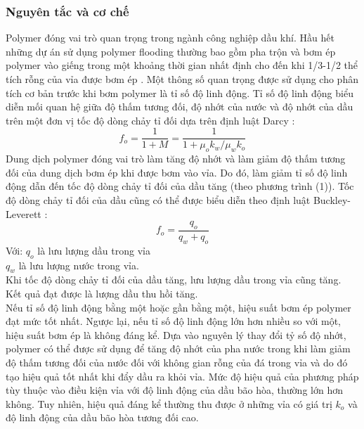 \documentclass[12pt,a4paper]{article}
\begin{document}
	\subsubsection{Nguyên tắc và cơ chế}
	Polymer đóng vai trò quan trọng trong ngành công nghiệp dầu khí. Hầu hết những dự án sử dụng polymer flooding thường bao gồm pha trộn và bơm ép polymer vào giếng trong một khoảng thời gian nhất định cho đến khi 1/3-1/2 thể tích rỗng của vỉa được bơm ép \cite{abidin2012polymers}. Một thông số quan trọng được sử dụng cho phân tích cơ bản trước khi bơm polymer là tỉ số độ linh động. Tỉ số độ linh động biểu diễn mối quan hệ giữa độ thấm tương đối, độ nhớt của nước và độ nhớt của dầu trên một đơn vị tốc độ dòng chảy tỉ đối dựa trên định luật Darcy \cite{abidin2012polymers}:
		\begin{equation}
			f_o=\frac{1}{1+M}=\frac{1}{1+\mu_{o}k_w/\mu_{w}k_o}
		\end{equation}
	Dung dịch polymer đóng vai trò làm tăng độ nhớt và làm giảm độ thấm tương đối của dung dịch bơm ép khi được bơm vào vỉa. Do đó, làm giảm tỉ số độ linh động dẫn đến tốc độ dòng chảy tỉ đối của dầu tăng (theo phương trình (1)). Tốc độ dòng chảy tỉ đối của dầu cũng có thể được biểu diễn theo định luật Buckley-Leverett \cite{kantzas2012fundamentals}:
		\begin{equation}
			f_o=\frac{q_o}{q_w+q_o}
		\end{equation}
	Với: \hspace*{15pt} $q_o$ là lưu lượng dầu trong vỉa\\
	\hspace*{37pt} $q_w$ là lưu lượng nước trong vỉa.\\
	Khi tốc độ dòng chảy tỉ đối của dầu tăng, lưu lượng dầu trong vỉa cũng tăng. Kết quả đạt được là lượng dầu thu hồi tăng.\\
	Nếu tỉ số độ linh động bằng một hoặc gần bằng một, hiệu suất bơm ép polymer đạt mức tốt nhất. Ngược lại, nếu tỉ số độ linh động lớn hơn nhiều so với một, hiệu suất bơm ép là không đáng kể. Dựa vào nguyên lý thay đổi tỷ số độ nhớt, polymer có thể được sử dụng để tăng độ nhớt của pha nước trong khi làm giảm độ thấm tương đối của nước đối với không gian rỗng của đá trong vỉa và do đó tạo hiệu quả tốt nhất khi đẩy dầu ra khỏi vỉa. Mức độ hiệu quả của phương pháp tùy thuộc vào điều kiện vỉa với độ linh động của dầu bão hòa, thường lớn hơn không. Tuy nhiên, hiệu quả đáng kể thường thu được ở những vỉa có giá trị $k_o$ và độ linh động của dầu bão hòa tương đối cao.
	\newpage
\end{document}
